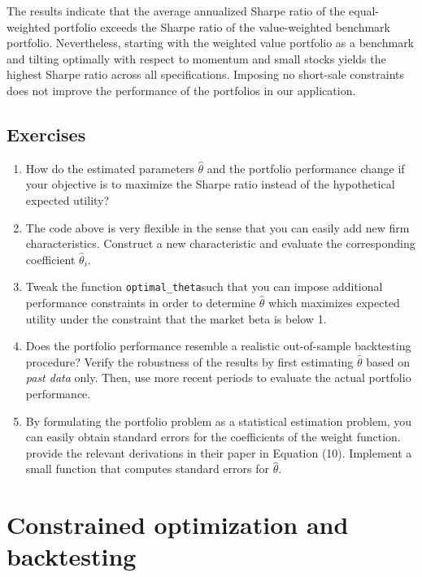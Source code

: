 \documentclass[
]{book}
\providecommand{\tightlist}{%
  \setlength{\itemsep}{0pt}\setlength{\parskip}{0pt}}
\begin{document}
The results indicate that the average annualized Sharpe ratio of the equal-weighted portfolio exceeds the Sharpe ratio of the value-weighted benchmark portfolio. Nevertheless, starting with the weighted value portfolio as a benchmark and tilting optimally with respect to momentum and small stocks yields the highest Sharpe ratio across all specifications. Imposing no short-sale constraints does not improve the performance of the portfolios in our application.

\hypertarget{exercises-10}{%
\section{Exercises}\label{exercises-10}}

\begin{enumerate}
\def\labelenumi{\arabic{enumi}.}
\tightlist
\item
  How do the estimated parameters \(\hat\theta\) and the portfolio performance change if your objective is to maximize the Sharpe ratio instead of the hypothetical expected utility?
\item
  The code above is very flexible in the sense that you can easily add new firm characteristics. Construct a new characteristic and evaluate the corresponding coefficient \(\hat\theta_i\).
\item
  Tweak the function \texttt{optimal\_theta}such that you can impose additional performance constraints in order to determine \(\hat\theta\) which maximizes expected utility under the constraint that the market beta is below 1.
\item
  Does the portfolio performance resemble a realistic out-of-sample backtesting procedure? Verify the robustness of the results by first estimating \(\hat\theta\) based on \emph{past data} only. Then, use more recent periods to evaluate the actual portfolio performance.
\item
  By formulating the portfolio problem as a statistical estimation problem, you can easily obtain standard errors for the coefficients of the weight function. \citet{Brandt2009} provide the relevant derivations in their paper in Equation (10). Implement a small function that computes standard errors for \(\hat\theta\).
\end{enumerate}

\hypertarget{constrained-optimization-and-backtesting}{%
\chapter{Constrained optimization and backtesting}\label{constrained-optimization-and-backtesting}}
\end{document}
